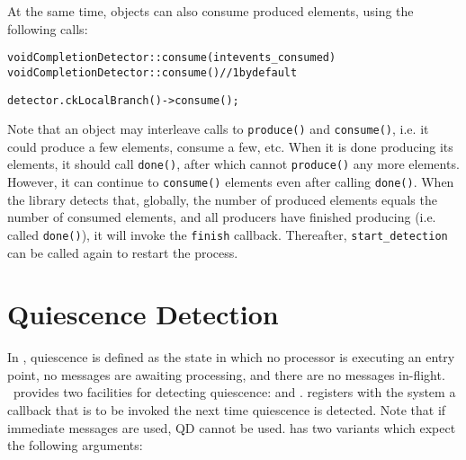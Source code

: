 At the same time, objects can also consume produced elements, using the following calls:

\begin{alltt}
void CompletionDetector::consume(int events_consumed)
void CompletionDetector::consume() // 1 by default
\end{alltt}

\begin{alltt}
detector.ckLocalBranch()->consume();
\end{alltt}

Note that an object may interleave calls to {\tt produce()} and {\tt consume()}, i.e.
it could produce a few elements, consume a few, etc. When it is done producing its elements,
it should call {\tt done()}, after which cannot {\tt produce()} any more elements. However,
it can continue to {\tt consume()} elements even after calling {\tt done()}. 
When the library detects that, globally, the number of produced elements equals
the number of consumed elements, and all producers have finished producing
(i.e. called {\tt done()}), it will invoke the \verb|finish| callback.
Thereafter, \verb|start_detection| can be called again to restart the process.

\section{Quiescence Detection}
\label{sec:qd}

In \charmpp, quiescence is defined as the state in which no
processor is executing an entry point, no messages are awaiting processing, and
there are no messages in-flight.  \charmpp\ provides two facilities for
detecting quiescence:  and .  
registers with the system a callback that is to be invoked the next time
quiescence is detected. Note that if immediate messages are
used, QD cannot be used.   has two variants
which expect the following arguments: 

